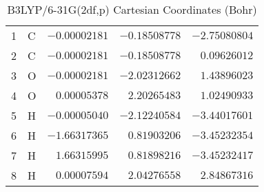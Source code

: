 \documentclass[10pt,oneside]{article}
\begin{document}
\begin{table}[h!]
\centering
\caption{B3LYP/6-31G(2df,p) Cartesian Coordinates (Bohr)}
\begin{tabular}{llrrr}
1  & C  & $-0.00002181$ & $-0.18508778$ & $-2.75080804$ \\
2  & C  & $-0.00002181$ & $-0.18508778$ & $ 0.09626012$ \\
3  & O  & $-0.00002181$ & $-2.02312662$ & $ 1.43896023$ \\
4  & O  & $ 0.00005378$ & $ 2.20265483$ & $ 1.02490933$ \\
5  & H  & $-0.00005040$ & $-2.12240584$ & $-3.44017601$ \\
6  & H  & $-1.66317365$ & $ 0.81903206$ & $-3.45232354$ \\
7  & H  & $ 1.66315995$ & $ 0.81898216$ & $-3.45232417$ \\
8  & H  & $ 0.00007594$ & $ 2.04276558$ & $ 2.84867316$ \\
\end{tabular}
\end{table}

\clearpage
\end{document}
